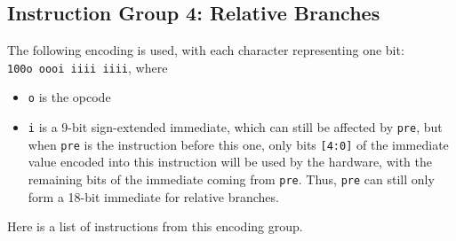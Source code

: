 \documentclass{article}
\begin{document}
	\doublespacing

	\subsection{Instruction Group 4:  Relative Branches}
	The following encoding is used, with each character representing one
	bit:  \\
	\texttt{100o oooi iiii iiii}, where

	\singlespacing
	\begin{itemize}
		\item \texttt{o} is the opcode
		\item \texttt{i} is a 9-bit sign-extended immediate, which can
		still be affected by \texttt{pre}, but when \texttt{pre} is the
		instruction before this one, only bits \texttt{[4:0]} of the
		immediate value encoded into this instruction will be used by the
		hardware, with the remaining bits of the immediate coming from
		\texttt{pre}.  Thus, \texttt{pre} can still only form a 18-bit
		immediate for relative branches.
	\end{itemize}
	\doublespacing

	Here is a list of instructions from this encoding group.
\end{document}

